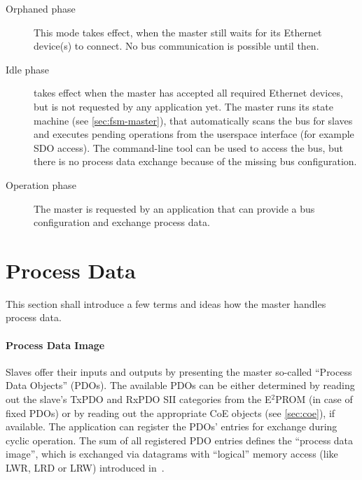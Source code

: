 \documentclass[a4paper,12pt,BCOR=6mm,bibtotoc,idxtotoc]{scrbook}
\begin{document}
\begin{description}

\item[Orphaned phase] This mode takes effect, when the
master still waits for its Ethernet device(s) to connect. No bus communication
is possible until then.

\item[Idle phase] takes effect when the master has accepted
all required Ethernet devices, but is not requested by any application yet.
The master runs its state machine (see \autoref{sec:fsm-master}), that
automatically scans the bus for slaves and executes pending operations from
the userspace interface (for example SDO access). The command-line tool can be
used to access the bus, but there is no process data exchange because of the
missing bus configuration.

\item[Operation phase] The master is requested by an
application that can provide a bus configuration and exchange process data.

\end{description}


\section{Process Data}
\label{sec:processdata}

This section shall introduce a few terms and ideas how the master handles
process data.

\paragraph{Process Data Image}

Slaves offer their inputs and outputs by presenting the master so-called
``Process Data Objects'' (PDOs). The available PDOs can be either
determined by reading out the slave's TxPDO and RxPDO SII categories from the
E$^2$PROM (in case of fixed PDOs) or by reading out the appropriate CoE
objects (see \autoref{sec:coe}), if available.  The application can register
the PDOs' entries for exchange during cyclic operation. The sum of all
registered PDO entries defines the ``process data image'', which is exchanged
via datagrams with ``logical'' memory access (like LWR, LRD or LRW) introduced
in~\cite[sec.~5.4]{dlspec}.
\end{document}
